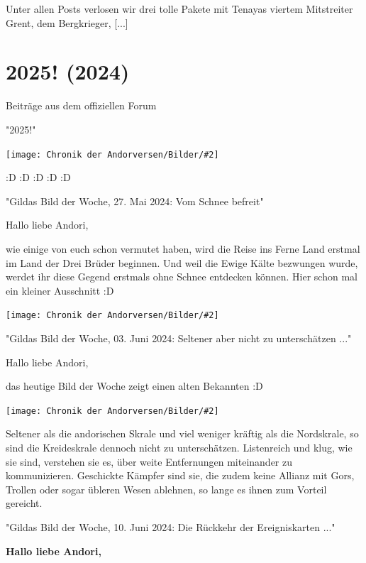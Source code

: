 \documentclass[10pt, a4paper, oneside]{book}
\newcommand{\fillbreak}{\vspace*{\fill}\columnbreak}
\newcommand{\storytext}[1]{%
    \section{#1}%
    \label{Storytext: #1}%
}
\newcommand{\bildmitts}[2][height=0.32\textwidth,width=0.48\textwidth,keepaspectratio]{%
    \begin{center}
        \texttt{[image: Chronik der Andorversen/Bilder/\#2]}
    \end{center}
}
\begin{document}
\begin{multicols}{2}
[...] Unter allen Posts verlosen wir drei tolle Pakete mit Tenayas viertem Mitstreiter Grent, dem Bergkrieger, [...]





\fillbreak
\storytext{2025! (2024)}




\begin{center}
    Beiträge aus dem offiziellen Forum

    "2025!"
\end{center}

\bildmitts{2025! 1.jpeg}

:D :D :D :D :D


\begin{center}
    "Gildas Bild der Woche, 27. Mai 2024: Vom Schnee befreit"
\end{center}

Hallo liebe Andori,

wie einige von euch schon vermutet haben, wird die Reise ins Ferne Land erstmal im Land der Drei Brüder beginnen. Und weil die Ewige Kälte bezwungen wurde, werdet ihr diese Gegend erstmals ohne Schnee entdecken können. Hier schon mal ein kleiner Ausschnitt :D

\bildmitts{2025! 2.jpeg}




\begin{center}
    "Gildas Bild der Woche, 03. Juni 2024: Seltener aber nicht zu unterschätzen ..."
\end{center}

Hallo liebe Andori,

das heutige Bild der Woche zeigt einen alten Bekannten :D

\bildmitts{2025! 3.jpeg}

Seltener als die andorischen Skrale und viel weniger kräftig als die Nordskrale, so sind die Kreideskrale dennoch nicht zu unterschätzen. Listenreich und klug, wie sie sind, verstehen sie es, über weite Entfernungen miteinander zu kommunizieren. Geschickte Kämpfer sind sie, die zudem keine Allianz mit Gors, Trollen oder sogar übleren Wesen ablehnen, so lange es ihnen zum Vorteil gereicht.



\begin{center}
    "Gildas Bild der Woche, 10. Juni 2024: Die Rückkehr der Ereigniskarten ..."
\end{center}

\textbf{Hallo liebe Andori,}


\end{multicols}
\end{document}
